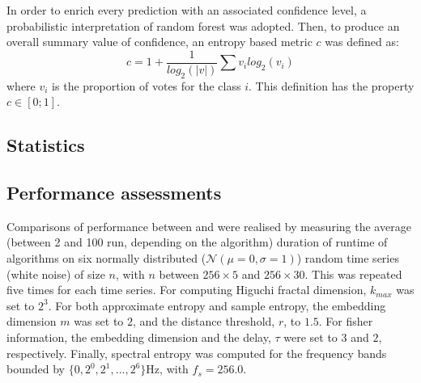 In order to enrich every prediction with an associated confidence level, a probabilistic interpretation of random forest was adopted\citationneeded{}.
Then, to produce an overall summary value of confidence, an entropy based metric $c$ was defined as:
\begin{equation}
c = 1 + \frac{1}{log_2(|v|)}\sum{v_i  log_2(v_i)}
\label{eq:entropy}
\end{equation}
where $v_i$ is the proportion of votes for the class $i$. This definition has the property $c \in [0;1]$.

\subsection{Statistics}


\subsection{Performance assessments}
Comparisons of performance between \pr{} and \pyeeg{} were realised by measuring the average (between 2 and 100 run, depending on the algorithm) duration of runtime of algorithms on six
normally distributed ($\mathcal{N}(\mu=0,\sigma=1)$) random time series (\ie white noise) of size $n$,
with $n$ between $256 \times{} 5$ and $256 \times{} 30$.
This was repeated five times for each time series.
For computing  Higuchi fractal dimension, $k_{max}$ was set to $2^3$.
For both approximate entropy and sample entropy, the embedding dimension $m$ was set to $2$, and the distance threshold, $r$, to $1.5$.
For fisher information, the embedding dimension and the delay, $\tau$ were set to $3$ and $2$, respectively.
Finally, spectral entropy was computed for the frequency bands bounded by $\{0, 2^0, 2^1, ..., 2^6\}$Hz, with $f_s = 256.0$.
